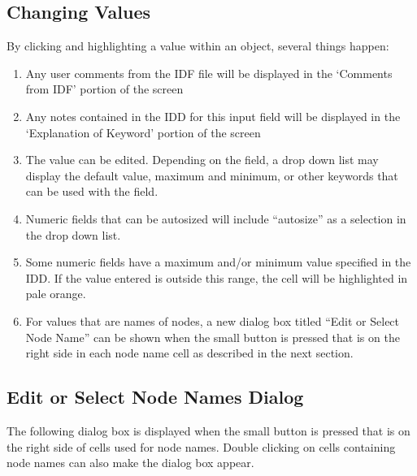 \subsection{Changing Values}\label{changing-values}

By clicking and highlighting a value within an object, several things happen:

\begin{enumerate}
\def\labelenumi{\arabic{enumi})}
\item
  Any user comments from the IDF file will be displayed in the `Comments from IDF' portion of the screen
\item
  Any notes contained in the IDD for this input field will be displayed in the `Explanation of Keyword' portion of the screen
\item
  The value can be edited. Depending on the field, a drop down list may display the default value, maximum and minimum, or other keywords that can be used with the field.
\item
  Numeric fields that can be autosized will include ``autosize'' as a selection in the drop down list.
\item
  Some numeric fields have a maximum and/or minimum value specified in the IDD. If the value entered is outside this range, the cell will be highlighted in pale orange.
\item
  For values that are names of nodes, a new dialog box titled ``Edit or Select Node Name'' can be shown when the small button is pressed that is on the right side in each node name cell as described in the next section.
\end{enumerate}

\subsection{Edit or Select Node Names Dialog}\label{edit-or-select-node-names-dialog}

The following dialog box is displayed when the small button is pressed that is on the right side of cells used for node names. Double clicking on cells containing node names can also make the dialog box appear.

